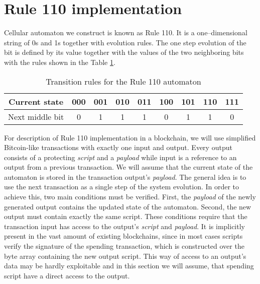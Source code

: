 \documentclass[runningheads]{llncs}
\newcommand{\payload}{\textit{payload}}
\newcommand{\script}{\textit{script}}
\begin{document}
    \section{Rule 110 implementation}
    Cellular automaton we construct is known as Rule 110.
    It is a one--dimensional string of 0s and 1s together with evolution rules.
    The one step evolution of the bit is defined by its value together with the
    values of the two neighboring bits with the rules shown in the Table
    \ref{tab:transitions}.
    \begin{table}
        \caption{Transition rules for the Rule 110 automaton}
        \label{tab:transitions}
        \centering
        \begin{tabular} {| *{9}{c|} }
            \hline
            Current state & 000 & 001 & 010 & 011 & 100 & 101 & 110 & 111 \\ \hline
            Next middle bit & 0 & 1 & 1 & 1 & 0 & 1 & 1 & 0 \\
            \hline
        \end{tabular}
    \end{table}

    For description of Rule 110 implementation in a blockchain, we will use simplified Bitcoin-like
    transactions with exactly one input and output. Every output consists of a protecting \script{}
    and a \payload{} while input is a reference to an output from a previous transaction.
    We will assume that the current state of the automaton is stored in the transaction output's \payload{}.
    The general idea is to use the next transaction as a single
    step of the system evolution. In order to achieve this, two main conditions must
    be verified. First, the \payload{} of the newly generated output contains
    the updated state of the automaton. Second, the new output must contain
    exactly the same script. These conditions require that the transaction input has
    access to the output's \script{} and \payload{}. It is implicitly present in the
    vast amount of existing blockchains, since in most cases scripts verify the
    signature of the spending transaction, which is constructed over the byte array
    containing the new output script. This way of access to an output's data may be
    hardly exploitable and in this section we will assume, that spending script have a
    direct access to the output.
\end{document}
